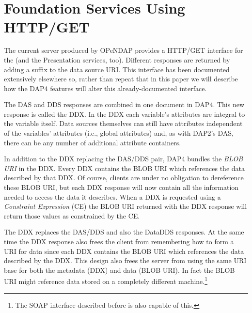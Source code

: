 \documentclass[justify]{dods-paper}
\begin{document}


\section{Foundation Services Using HTTP/GET}

The current server produced by OPeNDAP provides a HTTP/GET interface
for the \FSs (and the Presentation services, too). Different responses
are returned by adding a suffix to the data source URI. This interface
has been documented extensively elsewhere so, rather than repeat that
in this paper we will describe how the DAP4 features will alter this
already-documented interface.

The DAS and DDS responses are combined in one document in DAP4. This
new response is called the DDX. In the DDX each variable's attributes
are integral to the variable itself. Data sources themselves can still
have attributes independent of the variables' attributes (i.e., global
attributes) and, as with DAP2's DAS, there can be any number of
additional  attribute containers.

In addition to the DDX replacing the DAS/DDS pair, DAP4 bundles the
\emph{BLOB URI} in the DDX. Every DDX contains the BLOB URI which
references the data described by that DDX. Of course, clients are
under no obligation to dereference these BLOB URI, but each DDX
response will now contain all the information needed to access the
data it describes. When a DDX is requested using a \emph{Constraint
  Expression} (CE) the BLOB URI returned with the DDX response will
return those values as constrained by the CE.

The DDX replaces the DAS/DDS and also the DataDDS responses. At the
same time the DDX response also frees the client from remembering how
to form a URI for data since each DDX contains the BLOB URI which
references the data described by the DDX. This design also frees the
server from using the same URI base for both the metadata (DDX) and
data (BLOB URI). In fact the BLOB URI might reference data stored on a
completely different machine.\footnote{The SOAP interface described
  before is also capable of this.}
\end{document}
